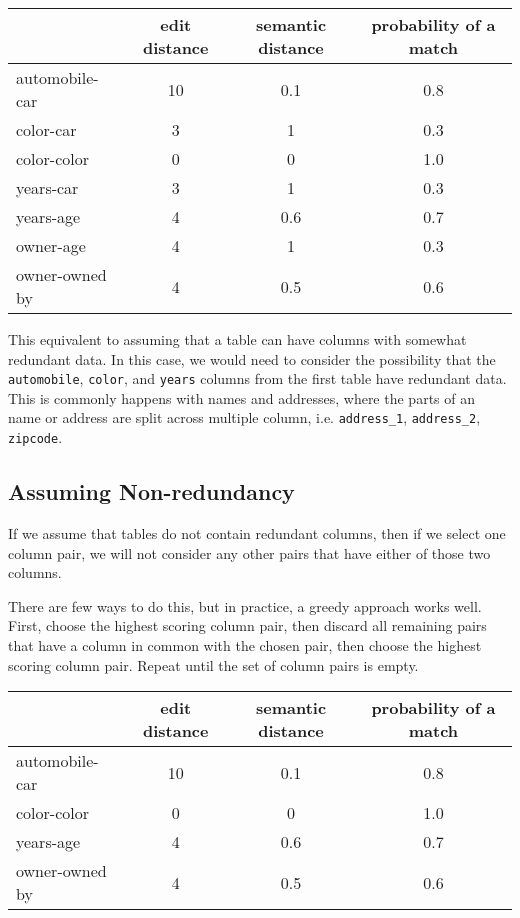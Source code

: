 \documentclass{datamade}
\theoremstyle{definition}
\theoremstyle{remark}
\begin{document}
\begin{center}
\begin{tabular}{|l|c|c|c|}
  \hline
  & edit distance & semantic distance & \textbf{probability of a match} \\\hline
  automobile-car & 10 & 0.1 & 0.8 \\\hline
  color-car & 3 & 1 & 0.3 \\\hline
  color-color & 0 & 0 & 1.0 \\\hline
  years-car & 3 & 1 & 0.3 \\\hline
  years-age & 4 & 0.6 & 0.7 \\\hline
  owner-age & 4 & 1 & 0.3 \\\hline
  owner-owned by & 4 & 0.5 & 0.6 \\\hline
\end{tabular}
\end{center}

This equivalent to assuming that a table can have columns with
somewhat redundant data. In this case, we would need to consider the
possibility that the \verb+automobile+, \verb+color+, and \verb+years+
columns from the first table have redundant data. This is commonly
happens with names and addresses, where the parts of an name or
address are split across multiple column, i.e. \verb+address_1+,
\verb+address_2+, \verb+zipcode+.

\subsection*{Assuming Non-redundancy}
If we assume that tables do not contain redundant columns, then if we
select one column pair, we will not consider any other pairs that have
either of those two columns.

There are few ways to do this, but in practice, a greedy approach
works well. First, choose the highest scoring column pair, then
discard all remaining pairs that have a column in common with the
chosen pair, then choose the highest scoring column pair. Repeat until
the set of column pairs is empty.

\begin{center}
\begin{tabular}{|l|c|c|c|}
  \hline
  & edit distance & semantic distance & \textbf{probability of a match} \\\hline
  automobile-car & 10 & 0.1 & 0.8 \\\hline
  color-color & 0 & 0 & 1.0 \\\hline
  years-age & 4 & 0.6 & 0.7 \\\hline
  owner-owned by & 4 & 0.5 & 0.6 \\\hline
\end{tabular}
\end{center}
\end{document}

